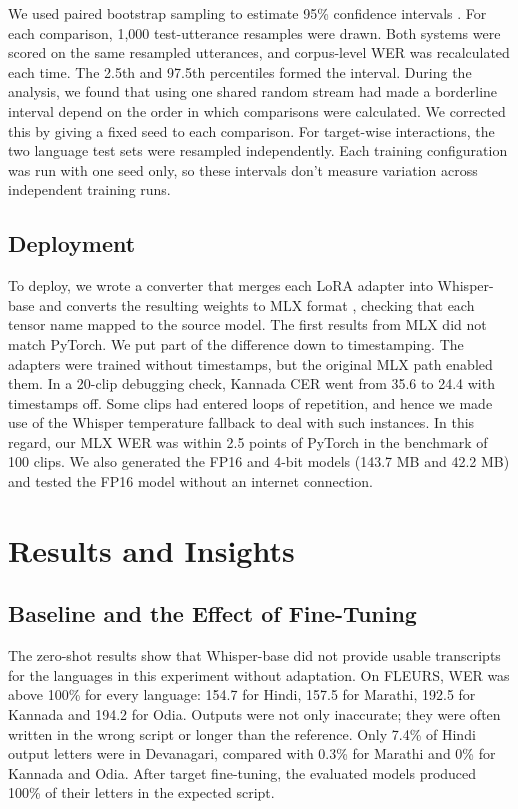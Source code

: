 \documentclass[conference]{IEEEtran}
\begin{document}
We used paired bootstrap sampling to estimate 95\% confidence intervals \cite{bisani2004bootstrap}. For each comparison, 1,000 test-utterance resamples were drawn. Both systems were scored on the same resampled utterances, and corpus-level WER was recalculated each time. The 2.5th and 97.5th percentiles formed the interval. During the analysis, we found that using one shared random stream had made a borderline interval depend on the order in which comparisons were calculated. We corrected this by giving a fixed seed to each comparison. For target-wise interactions, the two language test sets were resampled independently. Each training configuration was run with one seed only, so these intervals don't measure variation across independent training runs.

\subsection{Deployment}

To deploy, we wrote a converter that merges each LoRA adapter into Whisper-base and converts the resulting weights to MLX format \cite{mlx2023}, checking that each tensor name mapped to the source model. The first results from MLX did not match PyTorch. We put part of the difference down to timestamping. The adapters were trained without timestamps, but the original MLX path enabled them. In a 20-clip debugging check, Kannada CER went from 35.6 to 24.4 with timestamps off. Some clips had entered loops of repetition, and hence we made use of the Whisper temperature fallback to deal with such instances. In this regard, our MLX WER was within 2.5 points of PyTorch in the benchmark of 100 clips. We also generated the FP16 and 4-bit models (143.7 MB and 42.2 MB) and tested the FP16 model without an internet connection.

\section{Results and Insights}



\subsection{Baseline and the Effect of Fine-Tuning}

The zero-shot results show that Whisper-base did not provide usable
transcripts for the languages in this experiment without adaptation.
On FLEURS, WER was above 100\% for every language: 154.7 for Hindi,
157.5 for Marathi, 192.5 for Kannada and 194.2 for Odia. Outputs were
not only inaccurate; they were often written in the wrong script or
longer than the reference. Only 7.4\% of Hindi output letters were in
Devanagari, compared with 0.3\% for Marathi and 0\% for Kannada and
Odia. After target fine-tuning, the evaluated models produced 100\% of
their letters in the expected script.
\end{document}
